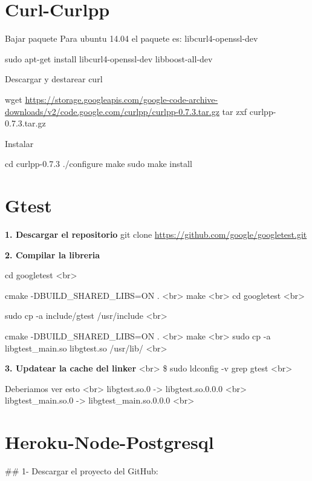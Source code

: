 \documentclass[letterpaper,10pt,spanish]{sphinxmanual}
\begin{document}
\section{Curl-Curlpp}
\label{Curl-Curlpp:curl-curlpp}\label{Curl-Curlpp::doc}
Bajar paquete
Para ubuntu 14.04 el paquete es: libcurl4-openssl-dev

sudo apt-get install libcurl4-openssl-dev libboost-all-dev

Descargar y destarear curl

wget \url{https://storage.googleapis.com/google-code-archive-downloads/v2/code.google.com/curlpp/curlpp-0.7.3.tar.gz}
tar zxf curlpp-0.7.3.tar.gz

Instalar

cd curlpp-0.7.3
./configure
make
sudo make install


\section{Gtest}
\label{Gtest:gtest}\label{Gtest::doc}
\textbf{1. Descargar el repositorio}
git clone \url{https://github.com/google/googletest.git}

\textbf{2. Compilar la libreria}

cd googletest \textless{}br\textgreater{}

cmake -DBUILD\_SHARED\_LIBS=ON . \textless{}br\textgreater{}
make \textless{}br\textgreater{}
cd googletest \textless{}br\textgreater{}

sudo cp -a include/gtest /usr/include \textless{}br\textgreater{}

cmake -DBUILD\_SHARED\_LIBS=ON . \textless{}br\textgreater{}
make \textless{}br\textgreater{}
sudo cp -a libgtest\_main.so libgtest.so /usr/lib/ \textless{}br\textgreater{}

\textbf{3. Updatear la cache del linker} \textless{}br\textgreater{}
\$ sudo ldconfig -v \textbar{} grep gtest \textless{}br\textgreater{}

Deberiamos ver esto \textless{}br\textgreater{}
libgtest.so.0 -\textgreater{} libgtest.so.0.0.0 \textless{}br\textgreater{}
libgtest\_main.so.0 -\textgreater{} libgtest\_main.so.0.0.0 \textless{}br\textgreater{}


\section{Heroku-Node-Postgresql}
\label{Heroku-Node-Postgresql::doc}\label{Heroku-Node-Postgresql:heroku-node-postgresql}
\#\# 1- Descargar el proyecto del GitHub:
\end{document}
